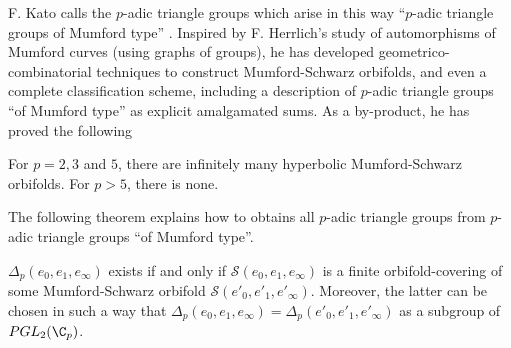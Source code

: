 \begin{para}\label{para::5.3.4} F. Kato calls the $p$-adic triangle groups
 which arise in this way ``$p$-adic triangle groups of Mumford type''
\cite{kato:_schwar_mumfor}. Inspired by F. Herrlich's study of automorphisms of
Mumford curves (using graphs of groups), he has developed
geometrico-combinatorial techniques to construct Mumford-Schwarz
orbifolds, and even a complete classification scheme, including a
description of $p$-adic triangle groups ``of Mumford type'' as explicit
amalgamated sums. As a by-product, he has proved the following
\end{para}

\begin{thm}[F. Kato]\label{thm::5.3.5} For $p= 2, 3$ and $5$, there are
 infinitely many hyperbolic Mumford-Schwarz orbifolds.  For $p>5$, there
 is none.
\end{thm}

\begin{para}\label{para::5.3.6} The following theorem explains how to obtains
 all $p$-adic triangle groups from $p$-adic triangle groups ``of Mumford
 type''.
\end{para}

\begin{thm}\label{thm::5.3.7} $\Delta_p(e_0,e_1,e_\infty)$ exists if and
 only if $\mathcal{S}(e_0,e_1,e_\infty)$ is a finite orbifold-covering
 of some Mumford-Schwarz orbifold
 $\mathcal{S}(e'_0,e'_1,e'_\infty)$. Moreover, the latter can be chosen
 in such a way that
 $\Delta_p(e_0,e_1,e_\infty)=\Delta_p(e'_0,e'_1,e'_\infty)$ as a subgroup
 of $PGL_2(\C_p)$.
\end{thm}

